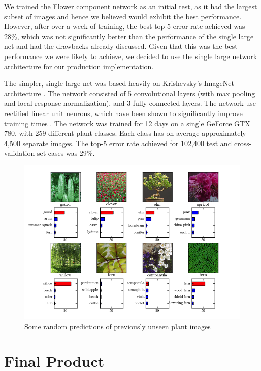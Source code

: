 \documentclass[a4paper,11pt]{article}
\begin{document}
\begin{description}
\hspace{5 mm} We trained the Flower component network as an initial test, as it had the largest subset of images and hence we believed would exhibit the best performance.  However, after over a week of training, the best top-5 error rate achieved was 28\%, which was not significantly better than the performance of the single large net and had the drawbacks already discussed. Given that this was the best performance we were likely to achieve, we decided to use the single large network architecture for our production implementation.

\hspace{5 mm} The simpler, single large net was based heavily on Krishevsky's ImageNet architecture \cite{cudaconv_2012}. The network consisted of 5 convolutional layers (with max pooling and local response normalization), and 3 fully connected layers. The network use rectified linear unit neurons, which have been shown to significantly improve training times \cite{cudaconv_2012}.  The network was trained for 12 days on a single GeForce GTX 780, with 259 different plant classes. Each class has on average approximately 4,500 separate images. The top-5 error rate achieved for 102,400 test and cross-validation set cases was 29\%.  

\begin{figure}[h!]
	\centering
	\includegraphics[width=1.0\linewidth]{preds.png}
	\caption{Some random predictions of previously unseen plant images}
        \label{fig:ml_preds}
\end{figure}


\section{Final Product}


\end{description}
\end{document}
